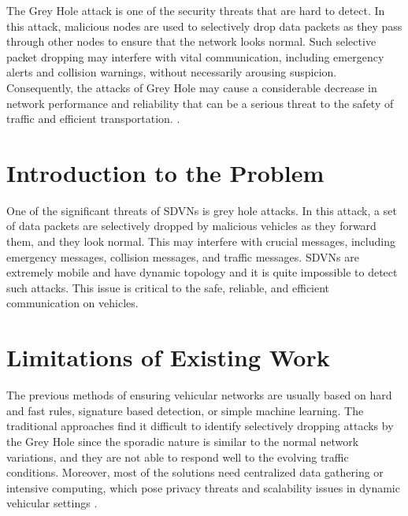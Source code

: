 \documentclass[12pt, a4paper]{report}
\newcommand{\mypar}{\vspace{0.8em}\noindent}
\begin{document}
\mypar
The Grey Hole attack is one of the security threats that are hard to detect. In this attack, malicious nodes are used to selectively drop data packets as they pass through other nodes to ensure that the network looks normal. Such selective packet dropping may interfere with vital communication, including emergency alerts and collision warnings, without necessarily arousing suspicion. Consequently, the attacks of Grey Hole may cause a considerable decrease in network performance and reliability that can be a serious threat to the safety of traffic and efficient transportation. \cite{rathod2017survey}.



\section{Introduction to the Problem}

One of the significant threats of SDVNs is grey hole attacks. In this attack, a set of data packets are selectively dropped by malicious vehicles as they forward them, and they look normal. This may interfere with crucial messages, including emergency messages, collision messages, and traffic messages. SDVNs are extremely mobile and have dynamic topology and it is quite impossible to detect such attacks. This issue is critical to the safe, reliable, and efficient communication on vehicles.


\section{Limitations of Existing Work}

The previous methods of ensuring vehicular networks are usually based on hard and fast rules, signature based detection, or simple machine learning. The traditional approaches find it difficult to identify selectively dropping attacks by the Grey Hole since the sporadic nature is similar to the normal network variations, and they are not able to respond well to the evolving traffic conditions. Moreover, most of the solutions need centralized data gathering or intensive computing, which pose privacy threats and scalability issues in dynamic vehicular settings \cite{ijaer2018, arizaga2025}.
\end{document}
